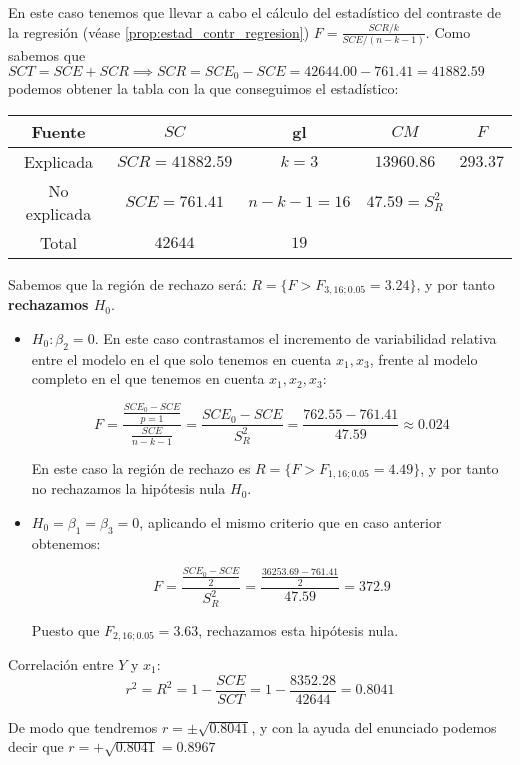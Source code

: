 \begin{problem}[9]
En este caso tenemos que llevar a cabo el cálculo del estadístico del contraste de la regresión (véase \ref{prop:estad_contr_regresion}) $F = \frac{SCR/k}{SCE/(n-k-1)}$. Como sabemos que $SCT = SCE + SCR \implies SCR = SCE_0-SCE = 42644.00 - 761.41 = 41882.59$ podemos obtener la tabla con la que conseguimos el estadístico:

\begin{center}
	\begin{tabular}{ c c c c c }
		Fuente & $SC$ & gl & $CM$ & $F$ \\ \hline
		Explicada & $SCR=41882.59$ & $k=3$ & $13960.86$ & $293.37$ \\
		No explicada & $SCE=761.41$ & $n-k-1=16$ & $47.59=S_R^2$ \\ \hline
		Total & $42644$ & $19$
	\end{tabular}
\end{center}

Sabemos que la región de rechazo será: $R = \{ F > F_{3,16;0.05} = 3.24 \}$, y por tanto \textbf{rechazamos $H_0$}.

\spart
\begin{itemize}
	\item $H_0: β_2=0$. En este caso contrastamos el incremento de variabilidad relativa entre el modelo en el que solo tenemos en cuenta $x_1,x_3$, frente al modelo completo en el que tenemos en cuenta $x_1,x_2,x_3$:

	\[F = \frac{\frac{SCE_0 - SCE}{p=1}}{\frac{SCE}{n-k-1}} = \frac{SCE_0 - SCE}{S_R^2} = \frac{762.55 - 761.41}{47.59} ≈ 0.024\]

	En este caso la región de rechazo es $R = \{ F > F_{1,16;0.05} = 4.49 \}$, y por tanto no rechazamos la hipótesis nula $H_0$.

	\item $H_0= β_1=β_3=0$, aplicando el mismo criterio que en caso anterior obtenemos:

	\[F = \frac{\frac{SCE_0 - SCE}{2}}{S_R^2} = \frac{\frac{36253.69 - 761.41}{2}}{47.59} = 372.9\]

	Puesto que $F_{2,16;0.05}=3.63$, rechazamos esta hipótesis nula.
\end{itemize}

\spart
Correlación entre $Y$ y $x_1$:
\[r^2 = R^2 = 1 - \frac{SCE}{SCT} = 1 - \frac{8352.28}{42644} = 0.8041\]

De modo que tendremos $r=\pm \sqrt{0.8041}$, y con la ayuda del enunciado podemos decir que $r = +\sqrt{0.8041} = 0.8967$

\end{problem}


